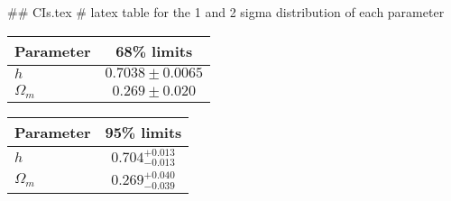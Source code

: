 ## CIs.tex
# latex table for the 1 and 2 sigma distribution of each parameter

\begin{tabular} { l  c}
 Parameter &  68\% limits\\
\hline
{\boldmath$h              $} & $0.7038\pm 0.0065          $\\
{\boldmath$\Omega_m       $} & $0.269\pm 0.020            $\\
\hline
\end{tabular}

\begin{tabular} { l  c}
 Parameter &  95\% limits\\
\hline
{\boldmath$h              $} & $0.704^{+0.013}_{-0.013}   $\\
{\boldmath$\Omega_m       $} & $0.269^{+0.040}_{-0.039}   $\\
\hline
\end{tabular}
